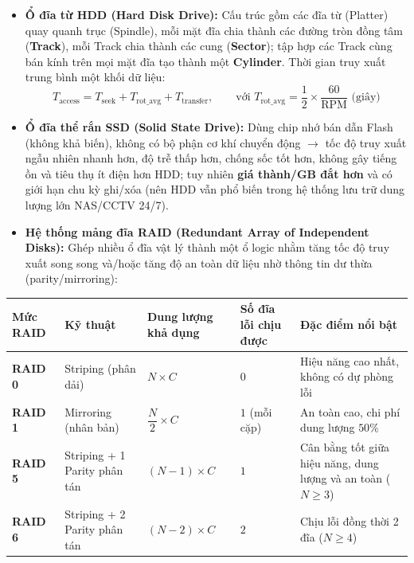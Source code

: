\begin{itemize}
    \item \textbf{Ổ đĩa từ HDD (Hard Disk Drive):} Cấu trúc gồm các đĩa từ (Platter) quay quanh trục (Spindle), mỗi mặt đĩa chia thành các đường tròn đồng tâm (\textbf{Track}), mỗi Track chia thành các cung (\textbf{Sector}); tập hợp các Track cùng bán kính trên mọi mặt đĩa tạo thành một \textbf{Cylinder}. Thời gian truy xuất trung bình một khối dữ liệu:
    $$T_{\text{access}} = T_{\text{seek}} + T_{\text{rot\_avg}} + T_{\text{transfer}}, \qquad \text{với } T_{\text{rot\_avg}} = \frac{1}{2} \times \frac{60}{\text{RPM}}\text{ (giây)}$$
    \item \textbf{Ổ đĩa thể rắn SSD (Solid State Drive):} Dùng chip nhớ bán dẫn Flash (không khả biến), không có bộ phận cơ khí chuyển động $\rightarrow$ tốc độ truy xuất ngẫu nhiên nhanh hơn, độ trễ thấp hơn, chống sốc tốt hơn, không gây tiếng ồn và tiêu thụ ít điện hơn HDD; tuy nhiên \textbf{giá thành/GB đắt hơn} và có giới hạn chu kỳ ghi/xóa (nên HDD vẫn phổ biến trong hệ thống lưu trữ dung lượng lớn NAS/CCTV 24/7).
    \item \textbf{Hệ thống mảng đĩa RAID (Redundant Array of Independent Disks):} Ghép nhiều ổ đĩa vật lý thành một ổ logic nhằm tăng tốc độ truy xuất song song và/hoặc tăng độ an toàn dữ liệu nhờ thông tin dư thừa (parity/mirroring):
\end{itemize}

\begin{tcolorbox}[bwbox, title={Tóm tắt các mức RAID phổ biến với $N$ ổ đĩa cùng dung lượng $C$}]
\begin{center}
\renewcommand{\arraystretch}{1.2}
\small
\begin{tabularx}{\linewidth}{|L{1.8cm}|L{3.0cm}|Z|Z|Y|}
\hline
\textbf{Mức RAID} & \textbf{Kỹ thuật} & \textbf{Dung lượng khả dụng} & \textbf{Số đĩa lỗi chịu được} & \textbf{Đặc điểm nổi bật} \\ \hline
\textbf{RAID 0} & Striping (phân dải) & $N \times C$ & $0$ & Hiệu năng cao nhất, không có dự phòng lỗi \\ \hline
\textbf{RAID 1} & Mirroring (nhân bản) & $\dfrac{N}{2} \times C$ & $1$ (mỗi cặp) & An toàn cao, chi phí dung lượng $50\%$ \\ \hline
\textbf{RAID 5} & Striping + 1 Parity phân tán & $(N - 1) \times C$ & $1$ & Cân bằng tốt giữa hiệu năng, dung lượng và an toàn ($N \ge 3$) \\ \hline
\textbf{RAID 6} & Striping + 2 Parity phân tán & $(N - 2) \times C$ & $2$ & Chịu lỗi đồng thời 2 đĩa ($N \ge 4$) \\ \hline
\end{tabularx}
\end{center}
\end{tcolorbox}

